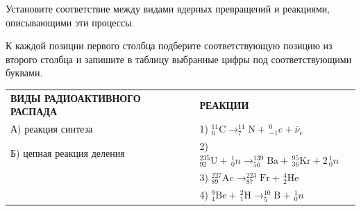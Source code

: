 \begin{taskbasic}[code={\label{task:nuclear_reaction_types}}]
Установите соответствие между видами ядерных превращений и реакциями, описывающими эти процессы.

К каждой позиции первого столбца подберите соответствующую позицию из второго столбца и запишите в таблицу выбранные цифры под соответствующими буквами.

\smallskip
\begin{tabular}{p{}p{}}
\textbf{ВИДЫ РАДИОАКТИВНОГО РАСПАДА} & \textbf{РЕАКЦИИ} \\
А) реакция синтеза & 1) $^{11}_6\text{C} \to ^{11}_7\text{N} + \,^0_{-1}e + \bar{\nu}_e$ \\
Б) цепная реакция деления & 2) $^{235}_{92}\text{U} + \,^1_0 n \to ^{139}_{56}\text{Ba} + \,^{95}_{36}\text{Kr} + 2\,^1_0 n$ \\
& 3) $^{227}_{89}\text{Ac} \to ^{223}_{87}\text{Fr} + \,^4_2\text{He}$ \\
& 4) $^9_4\text{Be} + \,^2_1\text{H} \to ^{10}_5\text{B} + \,^1_0 n$
\end{tabular}

\end{taskbasic}


